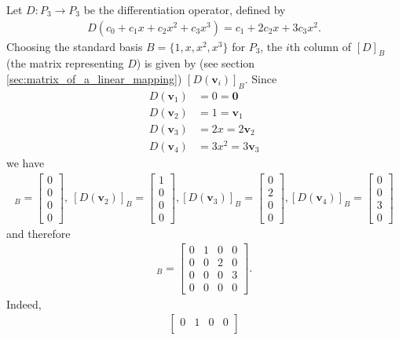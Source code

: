 \documentclass[12pt,letterpaper,reqno]{article}
\numberwithin{equation}{section}
\newcommand{\bv}{\mathbf{v}}
\begin{document}
\begin{example}
	Let $D:P_3 \to P_3$ be the differentiation operator, defined by 
	\begin{align*}
	D(c_0+c_1x+c_2x^2+c_3x^3)=c_1+2c_2x+3c_3x^2.
	\end{align*}
	Choosing the standard basis $B=\{1,x,x^2,x^3\}$ for $P_3$, the $i$th column of $[D]_B$ (the matrix representing $D$) is given by (see section \ref{sec:matrix_of_a_linear_mapping}) $[D(\bv_i)]_B$. Since
	\begin{align*}
		D(\bv_1)&=0=\mathbf{0} \\
		D(\bv_2)&=1=\bv_1 \\
		D(\bv_3)&=2x=2\bv_2 \\
		D(\bv_4)&=3x^2=3\bv_3
	\end{align*}
	we have
	\begin{align*}
		[D(\bv_1)]_B=\begin{bmatrix}
			0 \\ 0 \\ 0 \\0
		\end{bmatrix}, \ [D(\bv_2)]_B=\begin{bmatrix}
			1 \\ 0 \\ 0 \\0
		\end{bmatrix}, [D(\bv_3)]_B=\begin{bmatrix}
			0 \\ 2 \\ 0 \\0
		\end{bmatrix}, [D(\bv_4)]_B=\begin{bmatrix}
			0 \\ 0 \\ 3 \\0
		\end{bmatrix}
	\end{align*}
	and therefore
	\begin{align*}
		[D]_B=\begin{bmatrix}
			0 & 1 & 0 & 0 \\
			0 & 0 & 2 & 0 \\
			0 & 0 & 0 & 3 \\
			0 & 0 & 0 & 0
		\end{bmatrix}.
	\end{align*}
	Indeed,
	\begin{align*}
		\begin{bmatrix}
			0 & 1 & 0 & 0 \\

\end{bmatrix}
\end{align*}
\end{example}
\end{document}
